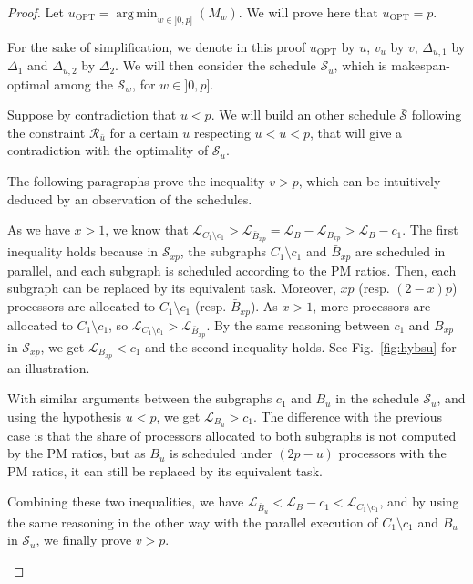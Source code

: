 \documentclass{llncs}
\newcommand{\newparskip}{\bigskip}
\newcommand{\LG}[1]{\mathcal{L}_{#1}}
\newcommand{\s}{\mathcal S\xspace}
\newcommand{\uopt}{\ensuremath{u_{\mathrm{OPT}}}\xspace}
\newcommand{\R}{\ensuremath{\mathcal{R}}\xspace}
\DeclareMathOperator*{\argmin}{arg\,min}
\begin{document}
\begin{proof}
Let $\displaystyle \uopt=\argmin_{w\in]0,p]}\left(M_w\right)$. We will prove here that $\uopt=p$.

For the sake of simplification, we denote in this proof $\uopt$ by $u$, $v_{u}$ by $v$, $\Delta_{u,1}$ by $\Delta_{1}$ and $\Delta_{u,2}$ by $\Delta_{2}$. We will then consider the schedule $\s_u$, which is makespan-optimal among the $\s_w$, for $w\in]0,p]$.

Suppose by contradiction that $u<p$. We will build an other schedule $\bar{\s}$ following the constraint $\R_{\bar{u}}$ for a certain $\bar{u}$ respecting $u<\bar{u}<p$, that will give a contradiction with the optimality of $\s_u$. 

\newparskip

The following paragraphs prove the inequality $v>p$, which can be intuitively deduced by an observation of the schedules.

As we have $x> 1$, we know that $\LG{C_1\setminus c_1} > \LG{\bar B_{xp}} = \LG{B} - \LG{B_{xp}} > \LG{B}-c_1$. The first inequality holds because in $\s_{xp}$, the subgraphs $C_1\setminus c_1$ and $\bar B_{xp}$ are scheduled in parallel, and each subgraph is scheduled according to the PM ratios. Then, each subgraph {\color{red} can be replaced by its equivalent task}.   Moreover, $xp$ (resp. $(2-x)p$) processors are allocated to  $C_1\setminus c_1$ (resp. $\bar B_{xp}$). As $x>1$, more processors are allocated to $C_1\setminus c_1$, so $\LG{C_1\setminus c_1} > \LG{\bar B_{xp}}$. 
By the same reasoning between $c_1$ and $B_{xp}$ in $\s_{xp}$, we get $\LG{B_{xp}}<c_1$ and the second inequality holds. See Fig.~\ref{fig:hybsu} for an illustration.

With similar arguments between the subgraphs $c_1$ and $B_u$ in the schedule $\s_u$, and using the hypothesis $u<p$, we get $\LG{B_u} > c_1$. The difference with the previous case is that the share of processors allocated to both subgraphs is not computed by the PM ratios, but as $B_u$ is scheduled under $(2p-u)$ processors with the PM ratios, {\color{red} it can still be replaced by its equivalent task}.

Combining these two inequalities, we have $\LG{\bar B_u} < \LG{B}-c_1 < \LG{C_1\setminus c_1}$, and by using the same reasoning in the other way with the parallel execution of $C_1\setminus c_1$ and $\bar B_u$ in $\s_u$, we finally prove $v>p$.

\begin{figure}[!ht]
\centering
\newcommand{\midy}{60pt}
\newcommand{\topy}{90pt}
\newcommand{\midx}{60pt}
\newcommand{\midlx}{30pt}
\newcommand{\topx}{91pt}


\end{figure}
\end{proof}
\end{document}
